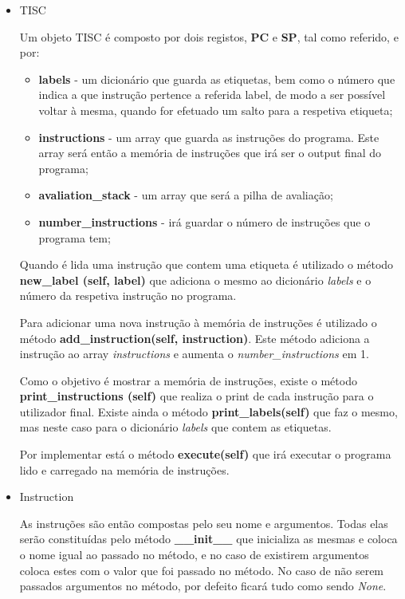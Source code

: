 \documentclass[titlepage,11pt,svgnames]{article}   %
\begin{document}
\begin{itemize}
\item TISC

Um objeto TISC é composto por dois registos, \textbf{PC} e \textbf{SP}, tal como referido, e por:
\begin{itemize}
\item \textbf{labels} - um dicionário que guarda as etiquetas, bem como o número que indica a que instrução pertence a referida label, de modo a ser possível voltar à mesma, quando for efetuado um salto para a respetiva etiqueta;
\item \textbf{instructions} - um array que guarda as instruções do programa. Este array será então a memória de instruções que irá ser o output final do programa;
\item \textbf{avaliation\_stack} - um array que será a pilha de avaliação;
\item \textbf{number\_instructions} - irá guardar o número de instruções que o programa tem;
\end{itemize}

Quando é lida uma instrução que contem uma etiqueta é utilizado o método \textbf{new\_label (self, label)} que adiciona o mesmo ao dicionário \textit{labels} e o número da respetiva instrução no programa.

Para adicionar uma nova instrução à memória de instruções é utilizado o método \textbf{add\_ins\-truction(self, instruction)}. Este método adiciona a instrução ao array \textit{instructions} e aumenta o \textit{number\_instructions} em 1.

Como o objetivo é mostrar a memória de instruções, existe o método \textbf{print\_instructions (self)} que realiza o print de cada instrução para o utilizador final.
Existe ainda o método \textbf{print\_labels(self)} que faz o mesmo, mas neste caso para o dicionário \textit{labels} que contem as etiquetas.

Por implementar está o método \textbf{execute(self)} que irá executar o programa lido e carregado na memória de instruções.


\item Instruction

As instruções são então compostas pelo seu nome e argumentos. Todas elas serão constituídas  pelo método \textbf{\_\_init\_\_} que inicializa as mesmas e coloca o nome igual ao passado no método, e no caso de existirem argumentos coloca estes com o valor que foi passado no método. No caso de não serem passados argumentos no método, por defeito ficará tudo como sendo \textit{None}.


\end{itemize}
\end{document}
